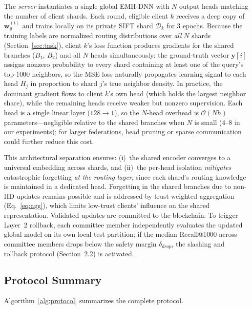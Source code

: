 \documentclass[conference]{IEEEtran}
\begin{document}
The \emph{server} instantiates a single global EMH-DNN with $N$ output heads matching the number of client shards. Each round, eligible client $k$ receives a deep copy of $\mathbf{w}_g^{(t)}$ and trains locally on its private SIFT shard $\mathcal{D}_k$ for 3 epochs. Because the training labels are normalized routing distributions over \emph{all} $N$ shards (Section~\ref{sec:task}), client $k$'s loss function produces gradients for the shared branches ($B_1$, $B_2$) and all $N$ heads simultaneously: the ground-truth vector $\mathbf{y}[i]$ assigns nonzero probability to every shard containing at least one of the query's top-1000 neighbors, so the MSE loss naturally propagates learning signal to each head $H_j$ in proportion to shard $j$'s true neighbor density. In practice, the dominant gradient flows to client $k$'s own head (which holds the largest neighbor share), while the remaining heads receive weaker but nonzero supervision. Each head is a single linear layer ($128 \to 1$), so the $N$-head overhead is $\mathcal{O}(Nh)$ parameters---negligible relative to the shared branches when $N$ is small (4--8 in our experiments); for larger federations, head pruning or sparse communication could further reduce this cost.

This architectural separation ensures: (i)~the shared encoder converges to a universal embedding across shards, and (ii)~the per-head isolation \emph{mitigates} catastrophic forgetting \emph{at the routing layer}, since each shard's routing knowledge is maintained in a dedicated head. Forgetting in the shared branches due to non-IID updates remains possible and is addressed by trust-weighted aggregation (Eq.~\ref{eq:agg}), which limits low-trust clients' influence on the shared representation. Validated updates are committed to the blockchain. To trigger Layer~2 rollback, each committee member independently evaluates the updated global model on its own local test partition; if the median Recall@1000 across committee members drops below the safety margin $\delta_{drop}$, the slashing and rollback protocol (Section~2.2) is activated.

\subsection{Protocol Summary}

Algorithm~\ref{alg:protocol} summarizes the complete protocol.
\end{document}
